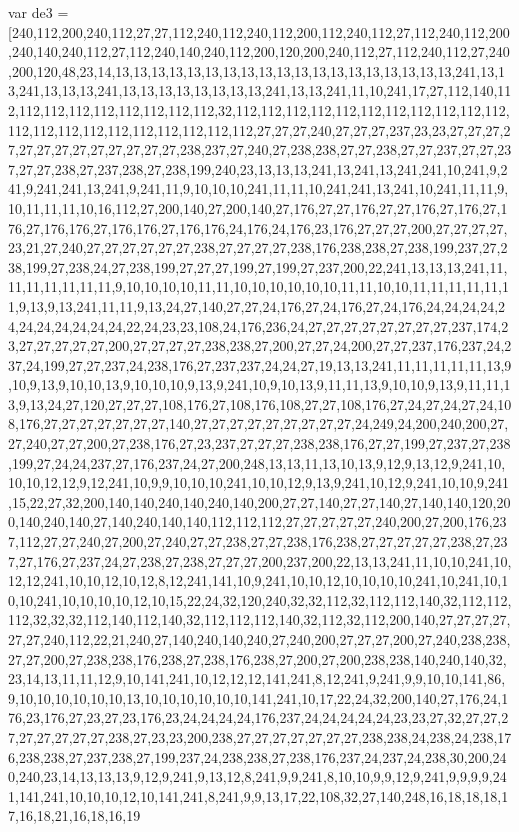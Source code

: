 var de3 = [240,112,200,240,112,27,27,112,240,112,240,112,200,112,240,112,27,112,240,112,200,240,140,240,112,27,112,240,140,240,112,200,120,200,240,112,27,112,240,112,27,240,200,120,48,23,14,13,13,13,13,13,13,13,13,13,13,13,13,13,13,13,13,13,13,13,241,13,13,241,13,13,13,241,13,13,13,13,13,13,13,13,241,13,13,241,11,10,241,17,27,112,140,112,112,112,112,112,112,112,112,112,32,112,112,112,112,112,112,112,112,112,112,112,112,112,112,112,112,112,112,112,112,112,27,27,27,240,27,27,27,237,23,23,27,27,27,27,27,27,27,27,27,27,27,27,27,238,237,27,240,27,238,238,27,27,238,27,27,237,27,27,237,27,27,238,27,237,238,27,238,199,240,23,13,13,13,241,13,241,13,241,241,10,241,9,241,9,241,241,13,241,9,241,11,9,10,10,10,241,11,11,10,241,241,13,241,10,241,11,11,9,10,11,11,11,10,16,112,27,200,140,27,200,140,27,176,27,27,176,27,27,176,27,176,27,176,27,176,176,27,176,176,27,176,176,24,176,24,176,23,176,27,27,27,200,27,27,27,27,23,21,27,240,27,27,27,27,27,27,238,27,27,27,27,238,176,238,238,27,238,199,237,27,238,199,27,238,24,27,238,199,27,27,27,199,27,199,27,237,200,22,241,13,13,13,241,11,11,11,11,11,11,11,9,10,10,10,10,11,11,10,10,10,10,10,10,11,11,10,10,11,11,11,11,11,11,9,13,9,13,241,11,11,9,13,24,27,140,27,27,24,176,27,24,176,27,24,176,24,24,24,24,24,24,24,24,24,24,24,22,24,23,23,108,24,176,236,24,27,27,27,27,27,27,27,27,237,174,23,27,27,27,27,27,200,27,27,27,27,238,238,27,200,27,27,24,200,27,27,237,176,237,24,237,24,199,27,27,237,24,238,176,27,237,237,24,24,27,19,13,13,241,11,11,11,11,11,13,9,10,9,13,9,10,10,13,9,10,10,10,9,13,9,241,10,9,10,13,9,11,11,13,9,10,10,9,13,9,11,11,13,9,13,24,27,120,27,27,27,108,176,27,108,176,108,27,27,108,176,27,24,27,24,27,24,108,176,27,27,27,27,27,27,27,140,27,27,27,27,27,27,27,27,27,24,249,24,200,240,200,27,27,240,27,27,200,27,238,176,27,23,237,27,27,27,238,238,176,27,27,199,27,237,27,238,199,27,24,24,237,27,176,237,24,27,200,248,13,13,11,13,10,13,9,12,9,13,12,9,241,10,10,10,12,12,9,12,241,10,9,9,10,10,10,241,10,10,12,9,13,9,241,10,12,9,241,10,10,9,241,15,22,27,32,200,140,140,240,140,240,140,200,27,27,140,27,27,140,27,140,140,120,200,140,240,140,27,140,240,140,140,112,112,112,27,27,27,27,27,240,200,27,200,176,237,112,27,27,240,27,200,27,240,27,27,238,27,27,238,176,238,27,27,27,27,27,238,27,237,27,176,27,237,24,27,238,27,238,27,27,27,200,237,200,22,13,13,241,11,10,10,241,10,12,12,241,10,10,12,10,12,8,12,241,141,10,9,241,10,10,12,10,10,10,10,241,10,241,10,10,10,241,10,10,10,10,12,10,15,22,24,32,120,240,32,32,112,32,112,112,140,32,112,112,112,32,32,32,112,140,112,140,32,112,112,112,140,32,112,32,112,200,140,27,27,27,27,27,27,240,112,22,21,240,27,140,240,140,240,27,240,200,27,27,27,200,27,240,238,238,27,27,200,27,238,238,176,238,27,238,176,238,27,200,27,200,238,238,140,240,140,32,23,14,13,11,11,12,9,10,141,241,10,12,12,12,141,241,8,12,241,9,241,9,9,10,10,141,86,9,10,10,10,10,10,10,13,10,10,10,10,10,10,141,241,10,17,22,24,32,200,140,27,176,24,176,23,176,27,23,27,23,176,23,24,24,24,24,176,237,24,24,24,24,24,23,23,27,32,27,27,27,27,27,27,27,27,238,27,23,23,200,238,27,27,27,27,27,27,27,238,238,24,238,24,238,176,238,238,27,237,238,27,199,237,24,238,238,27,238,176,237,24,237,24,238,30,200,240,240,23,14,13,13,13,9,12,9,241,9,13,12,8,241,9,9,241,8,10,10,9,9,12,9,241,9,9,9,9,241,141,241,10,10,10,12,10,141,241,8,241,9,9,13,17,22,108,32,27,140,248,16,18,18,18,17,16,18,21,16,18,16,19